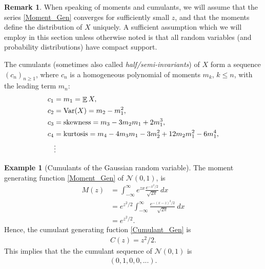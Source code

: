 \documentclass[letterpaper,11pt,oneside,reqno]{amsart}
\numberwithin{equation}{section}
\DeclareMathOperator{\EE}{\mathbb{E}}
\DeclareMathOperator{\VAR}{\mathrm{Var}}
\theoremstyle{definition}
\newtheorem{remark}[proposition]{Remark}
\newtheorem{example}[proposition]{Example}
\begin{document}
\begin{remark}
	When speaking of moments and cumulants, we will assume that the series \eqref{Moment_Gen} 
	converges for sufficiently small $z$, and that the moments define the distribution of $X$
	uniquely. A sufficient assumption which we will employ in this section unless otherwise
	noted is that all random variables (and probability distributions)
	have compact support.
\end{remark}

The cumulants (sometimes also called \emph{half/semi-invariants}) of $X$ form a sequence $(c_n)_{n\ge1}$, where $c_n$ is a homogeneous polynomial of moments $m_k$, $k\leq n$, with the leading term $m_n$:
\begin{equation}\label{skewness_kurtosis}
	\begin{split}
		c_1&=m_1=\EE X,\\
		c_2&=\VAR(X)=m_2-m_1^2,\\
		c_3&=\textnormal{skewness}=m_3-3m_2m_1+2m_1^3,\\
		c_4&=\textnormal{kurtosis}=m_4-4m_3m_1-3m_2^2+12m_2m_1^2-6m_1^4,\\
		&\vdots
	\end{split}
\end{equation}

\begin{example}[Cumulants of the Gaussian random variable]\label{ex:Cumulant_Seq_Ga}
	The moment generating function \eqref{Moment_Gen} of $\mathcal{N}(0,1)$, is 
	\begin{align*}
	    M(z)&= \int_{-\infty}^\infty e^{zx} \frac{e^{-x^2/2}}{\sqrt{2\pi}}\ dx\\
	    &=e^{z^2/2}\int_{-\infty}^\infty \frac{e^{-(x-z)^2/2}}{\sqrt{2\pi}}\ dx\\
	    &=e^{z^2/2}.
	\end{align*}
	Hence, the cumulant generating fuction \eqref{Cumulant_Gen} is 
	\begin{align*}
	    C(z)=z^2/2.
	\end{align*}
	This implies that the the cumulant sequence of $\mathcal{N}(0,1)$ is 
	\begin{align}\label{Cumulant_Seq_Ga}
	    (0, 1, 0, 0, ...).
	\end{align}
\end{example}
\end{document}
